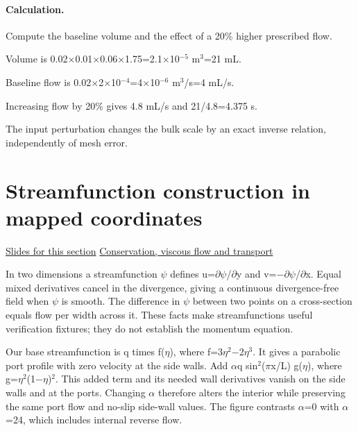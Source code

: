 \documentclass[11pt,letterpaper]{article}
\theoremstyle{definition}\newtheorem{definition}{Definition}\newtheorem{example}{Example}
\numberwithin{equation}{section}
\begin{document}
\paragraph{Calculation.} Compute the baseline volume and the effect of a 20\% higher prescribed flow.

Volume is 0.02\ensuremath{\times}0.01\ensuremath{\times}0.06\ensuremath{\times}1.75=2.1\ensuremath{\times}10\ensuremath{^{-5}} m\ensuremath{^{3}}=21 mL.

Baseline flow is 0.02\ensuremath{\times}2\ensuremath{\times}10\ensuremath{^{-4}}=4\ensuremath{\times}10\ensuremath{^{-6}} m\ensuremath{^{3}}/s=4 mL/s.

Increasing flow by 20\% gives 4.8 mL/s and 21/4.8=4.375 s.

The input perturbation changes the bulk scale by an exact inverse relation, independently of mesh error.
\section{Streamfunction construction in mapped coordinates}
\hypertarget{note-streamfunction-construction-in-mapped-coordinates}{}\label{note:streamfunction-construction-in-mapped-coordinates}
{\small \href{slides.html\#frame=a-through-flow-streamfunction\&step=1}{Slides for this section} \quad \href{../modules/cfd/index.html}{Conservation, viscous flow and transport}}\par
In two dimensions a streamfunction \ensuremath{\psi} defines u=\ensuremath{\partial}\ensuremath{\psi}/\ensuremath{\partial}y and v=\ensuremath{-}\ensuremath{\partial}\ensuremath{\psi}/\ensuremath{\partial}x. Equal mixed derivatives cancel in the divergence, giving a continuous divergence-free field when \ensuremath{\psi} is smooth. The difference in \ensuremath{\psi} between two points on a cross-section equals flow per width across it. These facts make streamfunctions useful verification fixtures; they do not establish the momentum equation.

Our base streamfunction is q times f(\ensuremath{\eta}), where f=3\ensuremath{\eta}\ensuremath{^{2}}\ensuremath{-}2\ensuremath{\eta}\ensuremath{^{3}}. It gives a parabolic port profile with zero velocity at the side walls. Add \ensuremath{\alpha}q sin\ensuremath{^{2}}(\ensuremath{\pi}x/L) g(\ensuremath{\eta}), where g=\ensuremath{\eta}\ensuremath{^{2}}(1\ensuremath{-}\ensuremath{\eta})\ensuremath{^{2}}. This added term and its needed wall derivatives vanish on the side walls and at the ports. Changing \ensuremath{\alpha} therefore alters the interior while preserving the same port flow and no-slip side-wall values. The figure contrasts \ensuremath{\alpha}=0 with \ensuremath{\alpha}=24, which includes internal reverse flow.
\end{document}
